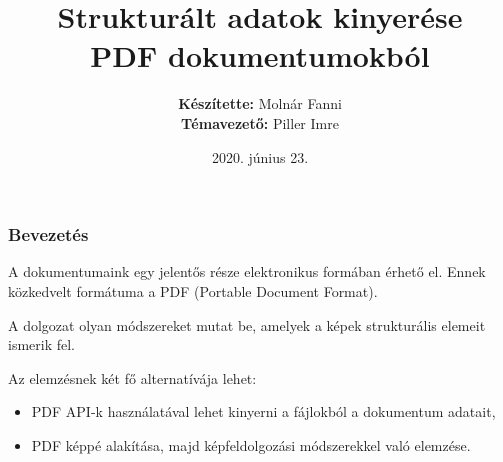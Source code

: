 \documentclass{beamer}
\begin{document}

\title[Strukturált adatok kinyerése PDF dokumentumokból]{Strukturált adatok kinyerése \\ PDF dokumentumokból}
\author[Molnár Fanni]{\textbf{Készítette:} Molnár Fanni \\ \medskip \textbf{Témavezető:} Piller Imre}
\date{2020. június 23.}

\frame{\titlepage}

\begin{frame}[fragile]
\frametitle{Bevezetés}

A dokumentumaink egy jelentős része elektronikus formában érhető el. Ennek közkedvelt formátuma a PDF (Portable Document Format).

\bigskip

A dolgozat olyan módszereket mutat be, amelyek a képek strukturális elemeit ismerik fel.

\bigskip

Az elemzésnek két fő alternatívája lehet:
\begin{itemize}
    \item PDF API-k használatával lehet kinyerni a fájlokból a dokumentum adatait,
    \item PDF képpé alakítása, majd képfeldolgozási módszerekkel való elemzése.
\end{itemize}

\end{frame}
\end{document}
